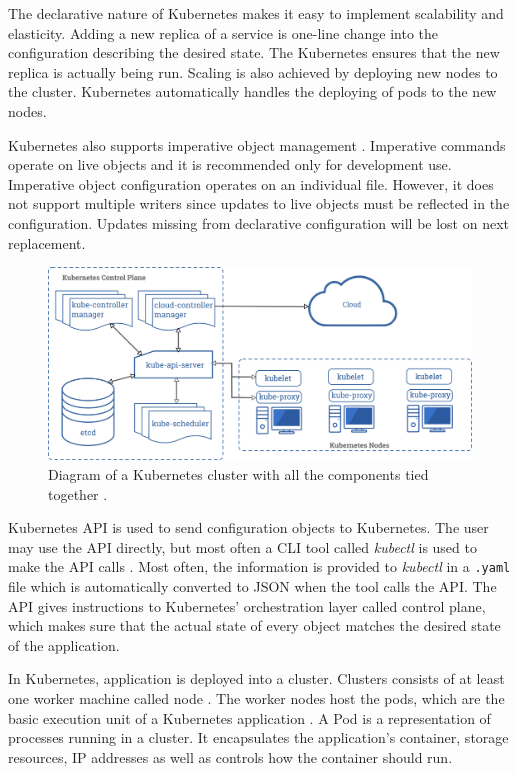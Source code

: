 \documentclass[article]{aaltoseries}
\begin{document}
The declarative nature of Kubernetes makes it easy to implement scalability and elasticity. Adding a new replica of a service is one-line change into the configuration describing the desired state. The Kubernetes ensures that the new replica is actually being run. Scaling is also achieved by deploying new nodes to the cluster. Kubernetes automatically handles the deploying of pods to the new nodes.

Kubernetes also supports imperative object management \cite{k8s-obj-man}. Imperative commands operate on live objects and it is recommended only for development use. Imperative object configuration operates on an individual file. However, it does not support multiple writers since updates to live objects must be reflected in the configuration. Updates missing from declarative configuration will be lost on next replacement.

\begin{figure}[hbt!]
    \centering
    \includegraphics[width=150mm]{figures/k8s.png}
    \caption{Diagram of a Kubernetes cluster with all the components tied together \cite{k8s-comps}.}
    \label{fig:k8s-figure}
\end{figure}

Kubernetes API is used to send configuration objects to Kubernetes. The user may use the API directly, but most often a CLI tool called \textit{kubectl} is used to make the API calls \cite{k8s-objects}. Most often, the information is provided to \textit{kubectl} in a \texttt{.yaml} file which is automatically converted to JSON when the tool calls the API. The API gives instructions to Kubernetes' orchestration layer called control plane, which makes sure that the actual state of every object matches the desired state of the application.

In Kubernetes, application is deployed into a cluster. Clusters consists of at least one worker machine called node \cite{k8s-comps}. The worker nodes host the pods, which are the basic execution unit of a Kubernetes application \cite{k8s-pods}. A Pod is a representation of processes running in a cluster. It encapsulates the application's container, storage resources, IP addresses as well as controls how the container should run.
\end{document}

